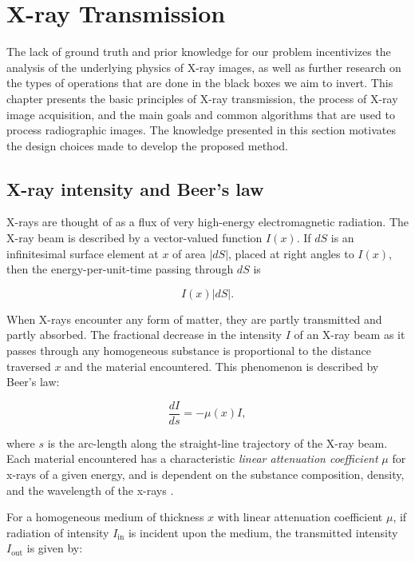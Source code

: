 \documentclass[nomenclature, english, bibtex]{kththesis}
\numberwithin{listing}{chapter}
\begin{document}
\chapter{X-ray Transmission}
\label{sec:xrayTransmissionModel}

The lack of ground truth and prior knowledge for our problem incentivizes the analysis of the underlying
physics of X-ray images, as well as further research on the types of operations that are done in the black boxes
we aim to invert. This chapter presents the basic principles of X-ray transmission, the process of X-ray image
acquisition, and the main goals and common algorithms that are used to process radiographic images. The
knowledge presented in this section motivates the design choices made to develop the proposed method.

\section{X-ray intensity and Beer's law}

X-rays are thought of as a flux of very high-energy electromagnetic radiation. The X-ray beam is
described by a vector-valued function $I(x)$. If $dS$ is an infinitesimal surface element at $x$ of area
$|dS|$, placed at right angles to $I(x)$, then the energy-per-unit-time passing through $dS$ is \cite[p.~56]{epstein2008}

\begin{equation}
    I (x) |dS|.
\end{equation}

When X-rays encounter any form of matter, they are partly transmitted and partly absorbed.
The fractional decrease in the intensity $I$ of an X-ray beam as it passes
through any homogeneous substance is proportional to the distance traversed $x$
and the material encountered\cite[p.~11]{cullityElementsXrayDiffraction2014}.
This phenomenon is described by Beer's law:

\begin{equation}
    \frac{dI}{ds} = -\mu(x)I,
    \label{eq:BeerLambert}
\end{equation}

where $s$ is the arc-length along the straight-line trajectory of the X-ray beam.
Each material encountered has a characteristic \textit{linear attenuation coefficient} $\mu$ for x-rays of a
given energy, and is dependent on the substance composition, density, and the wavelength of the x-rays \cite[p.~57]{epstein2008}.

For a homogeneous medium of thickness $x$ with linear attenuation coefficient $\mu$, if radiation of intensity
$I_{\text{in}}$ is incident upon the medium, the transmitted intensity $I_{\text{out}}$ is given by:
\end{document}
